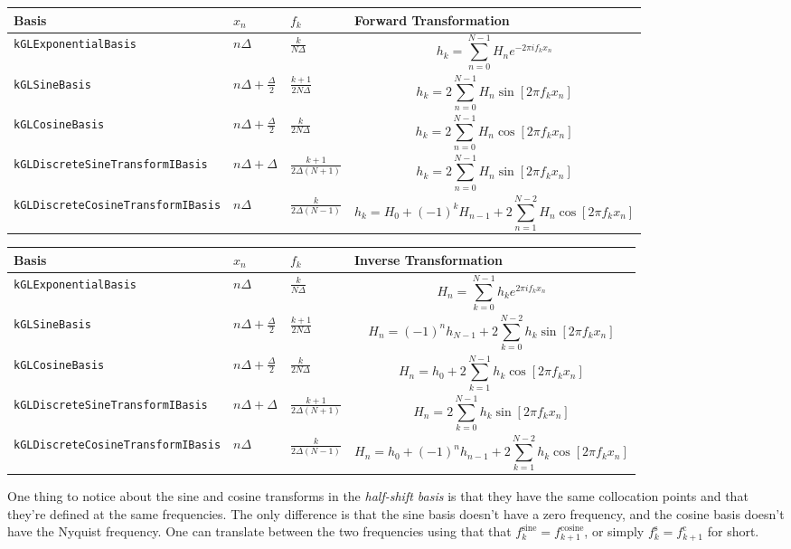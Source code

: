 \documentclass[11pt]{article}
\begin{document}
\begin{tabular}{lllL}
      \hline
      Basis &$x_n$ & $f_k$ & Forward Transformation \tabularnewline \hline \hline
      \verb"kGLExponentialBasis" & $n\Delta$ & $\frac{k}{N\Delta}$ & \[ h_k = \sum_{n=0}^{N-1} H_n e^{-2\pi i f_k x_n} \] \tabularnewline
      \verb"kGLSineBasis" & $ n\Delta + \frac{\Delta}{2}$ & $\frac{k+1}{2N\Delta}$ & \[ h_k = 2 \sum_{n=0}^{N-1} H_n \sin \left[ 2 \pi f_k x_n \right] \] \tabularnewline
      \verb"kGLCosineBasis" & $ n\Delta + \frac{\Delta}{2}$ & $\frac{k}{2N\Delta}$ & \[ h_k = 2 \sum_{n=0}^{N-1} H_n \cos \left[ 2 \pi f_k x_n \right] \] \tabularnewline
       \verb"kGLDiscreteSineTransformIBasis" & $n\Delta + \Delta$ & $\frac{k+1}{2 \Delta (N+1)}$ & \[ h_k = 2 \sum_{n=0}^{N-1} H_n \sin \left[ 2 \pi f_k x_n \right] \] \tabularnewline
      \verb"kGLDiscreteCosineTransformIBasis"&$n\Delta$ & $\frac{k}{2 \Delta (N-1)}$ & \[ h_k = H_{0} + (-1)^{k} H_{n-1} +  2 \sum_{n=1}^{N-2} H_n \cos \left[ 2 \pi f_k x_n \right] \] \tabularnewline 
      \hline
\end{tabular}

\begin{tabular}{lllL}
      \hline
      Basis &$x_n$ & $f_k$ & Inverse Transformation \tabularnewline \hline \hline
      \verb"kGLExponentialBasis" & $n\Delta$ & $\frac{k}{N\Delta}$ & \[ H_n = \sum_{k=0}^{N-1} h_k e^{2\pi i f_k x_n} \] \tabularnewline
      \verb"kGLSineBasis" & $ n\Delta + \frac{\Delta}{2}$ & $\frac{k+1}{2N\Delta}$ & \[ H_n = (-1)^n h_{N-1} + 2 \sum_{k=0}^{N-2} h_k \sin \left[ 2 \pi f_k x_n \right] \] \tabularnewline
      \verb"kGLCosineBasis" & $ n\Delta + \frac{\Delta}{2}$ & $\frac{k}{2N\Delta}$ & \[ H_n = h_{0} + 2 \sum_{k=1}^{N-1} h_k \cos \left[ 2 \pi f_k x_n \right] \] \tabularnewline
      \verb"kGLDiscreteSineTransformIBasis" & $n\Delta + \Delta$ & $\frac{k+1}{2 \Delta (N+1)}$ & \[ H_n = 2 \sum_{k=0}^{N-1} h_k \sin \left[ 2 \pi f_k x_n \right] \] \tabularnewline
      \verb"kGLDiscreteCosineTransformIBasis"&$n\Delta$ & $\frac{k}{2 \Delta (N-1)}$ & \[ H_n = h_{0} + (-1)^{n} h_{n-1} +  2 \sum_{k=1}^{N-2} h_k \cos \left[ 2 \pi f_k x_n \right] \] \tabularnewline 
      \hline
\end{tabular}

One thing to notice about the sine and cosine transforms in the \emph{half-shift basis} is that they have the same collocation points and that they're defined at the same frequencies. The only difference is that the sine basis doesn't have a zero frequency, and the cosine basis doesn't have the Nyquist frequency. One can translate between the two frequencies using that that $f_k^{\textrm{sine}}=f_{k+1}^{\textrm{cosine}}$, or simply $f_k^{\textrm{s}}=f_{k+1}^{\textrm{c}}$ for short.
\end{document}
